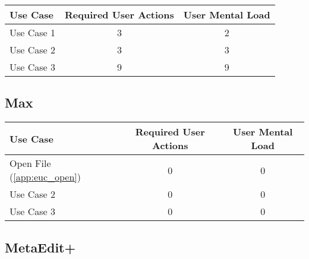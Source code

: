 \begin{tabularx}{\textwidth}{Xcc}
\textbf{Use Case} & \textbf{Required User Actions} & \textbf{User Mental Load}\\
\hline
Use Case 1                          & 3 & 2 \\
Use Case 2                          & 3 & 3 \\
Use Case 3                          & 9 & 9
\end{tabularx}

\subsection*{Max}

\begin{tabularx}{\textwidth}{Xcc}
\textbf{Use Case} & \textbf{Required User Actions} & \textbf{User Mental Load}\\
\hline
Open File (\ref{app:euc_open}) & 0 & 0 \\
Use Case 2                     & 0 & 0 \\
Use Case 3                     & 0 & 0
\end{tabularx}

\subsection*{MetaEdit+}




